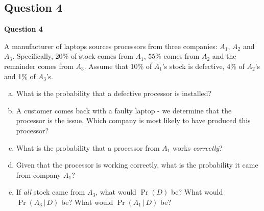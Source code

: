 \documentclass[compress]{beamer}        %
\makeatletter
\newcommand{\tcb}{\textcolor{beamer@blendedblue}}
\makeatother
\begin{document}
\subsection{Question 4}
\begin{frame}{\bf \tcb{Question 4}}


A manufacturer of laptops sources processors from three companies: $A_1$, $A_2$ and $A_3$. Specifically, 20\% of stock comes from $A_1$, $55\%$ comes from $A_2$ and the remainder comes from $A_3$. Assume that 10\% of $A_1$'s stock is defective, 4\% of $A_2$'s and 1\% of $A_3$'s.\\[0.3cm]

\begin{enumerate}[a)]\itemsep0.2cm
\item What is the probability that a defective processor is installed?
\item A customer comes back with a faulty laptop - we determine that the processor is the issue. Which company is most likely to have produced this processor?
\item What is the probability that a processor from $A_1$ works \emph{correctly}?
\item Given that the processor is working correctly, what is the probability it came from company $A_1$?
\item If \emph{all} stock came from $A_3$, what would $\Pr(D)$ be? What would $\Pr(A_3\,|\,D)$ be? What would $\Pr(A_1\,|\,D)$ be?
\end{enumerate}


\end{frame}
\end{document}
